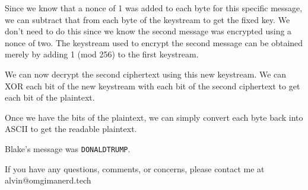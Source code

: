 \documentclass{math}
\begin{document}
Since we know that a nonce of 1 was added to each byte for this specific
message, we can subtract that from each byte of the keystream to get the fixed
key. We don't need to do this since we know the second message was encrypted
using a nonce of two. The keystream used to encrypt the second message can be
obtained merely by adding 1 (mod 256) to the first keystream.
\begin{center}
\end{center}
We can now decrypt the second ciphertext using this new keystream. We can XOR
each bit of the new keystream with each bit of the second ciphertext to get each
bit of the plaintext.
\begin{center}
\end{center}
Once we have the bits of the plaintext, we can simply convert each byte back
into ASCII to get the readable plaintext.
\begin{center}
\end{center}
Blake's message was \texttt{DONALDTRUMP}.

\begin{center}
  If you have any questions, comments, or concerns, please contact me at
  alvin@omgimanerd.tech
\end{center}
\end{document}

